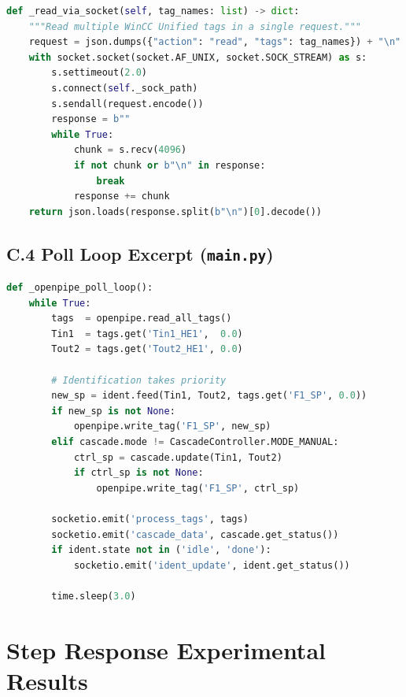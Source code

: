 \begin{lstlisting}[language=Python,
  caption={Unix socket read for Open Pipe tag batch request.}]
def _read_via_socket(self, tag_names: list) -> dict:
    """Read multiple WinCC Unified tags in a single request."""
    request = json.dumps({"action": "read", "tags": tag_names}) + "\n"
    with socket.socket(socket.AF_UNIX, socket.SOCK_STREAM) as s:
        s.settimeout(2.0)
        s.connect(self._sock_path)
        s.sendall(request.encode())
        response = b""
        while True:
            chunk = s.recv(4096)
            if not chunk or b"\n" in response:
                break
            response += chunk
    return json.loads(response.split(b"\n")[0].decode())
\end{lstlisting}

\section*{C.4 \quad Poll Loop Excerpt (\texttt{main.py})}

\begin{lstlisting}[language=Python,
  caption={Open Pipe poll loop: identification has priority over cascade.}]
def _openpipe_poll_loop():
    while True:
        tags  = openpipe.read_all_tags()
        Tin1  = tags.get('Tin1_HE1',  0.0)
        Tout2 = tags.get('Tout2_HE1', 0.0)

        # Identification takes priority
        new_sp = ident.feed(Tin1, Tout2, tags.get('F1_SP', 0.0))
        if new_sp is not None:
            openpipe.write_tag('F1_SP', new_sp)
        elif cascade.mode != CascadeController.MODE_MANUAL:
            ctrl_sp = cascade.update(Tin1, Tout2)
            if ctrl_sp is not None:
                openpipe.write_tag('F1_SP', ctrl_sp)

        socketio.emit('process_tags', tags)
        socketio.emit('cascade_data', cascade.get_status())
        if ident.state not in ('idle', 'done'):
            socketio.emit('ident_update', ident.get_status())

        time.sleep(3.0)
\end{lstlisting}

\chapter{Step Response Experimental Results}
\label{app:results}


